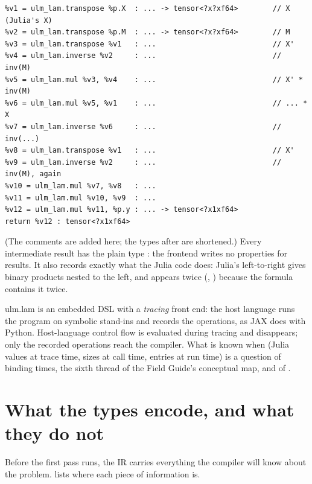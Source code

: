 \begin{lstlisting}
%v1 = ulm_lam.transpose %p.X  : ... -> tensor<?x?xf64>        // X   (Julia's X)
%v2 = ulm_lam.transpose %p.M  : ... -> tensor<?x?xf64>        // M
%v3 = ulm_lam.transpose %v1   : ...                           // X'
%v4 = ulm_lam.inverse %v2     : ...                           // inv(M)
%v5 = ulm_lam.mul %v3, %v4    : ...                           // X' * inv(M)
%v6 = ulm_lam.mul %v5, %v1    : ...                           // ... * X
%v7 = ulm_lam.inverse %v6     : ...                           // inv(...)
%v8 = ulm_lam.transpose %v1   : ...                           // X'
%v9 = ulm_lam.inverse %v2     : ...                           // inv(M), again
%v10 = ulm_lam.mul %v7, %v8   : ...
%v11 = ulm_lam.mul %v10, %v9  : ...
%v12 = ulm_lam.mul %v11, %p.y : ... -> tensor<?x1xf64>
return %v12 : tensor<?x1xf64>
\end{lstlisting}

(The comments are added here; the types after \code{:} are shortened.)
Every intermediate result has the plain type : the
frontend writes no properties for results. It also records exactly what
the Julia code does: Julia's left-to-right \code{*} gives binary products
nested to the left, and  appears twice (,
) because the formula contains it twice.

\begin{theory}[ (\FGs{3.7})]
ulm.lam is an embedded DSL with a \emph{tracing} front end: the host
language runs the program on symbolic stand-ins and records the operations,
as JAX does with Python. Host-language control flow is evaluated during
tracing and disappears; only the recorded operations reach the compiler.
What is known when (Julia values at trace time, sizes at call time, entries
at run time) is a question of binding times, the sixth thread of the Field
Guide's conceptual map, and of .
\end{theory}

\section{What the types encode, and what they do not}
\label{sec:gls-types}

Before the first pass runs, the IR carries everything the compiler will
know about the problem.  lists where each piece of
information is.

